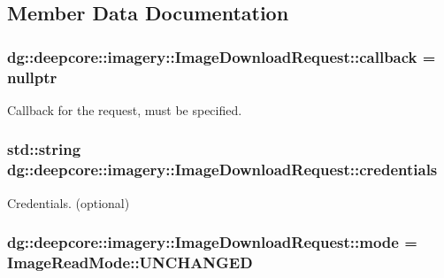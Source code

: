 \subsection{Member Data Documentation}
\subsubsection[{\texorpdfstring{callback}{callback}}]{ dg\+::deepcore\+::imagery\+::\+Image\+Download\+Request\+::callback = nullptr}\hypertarget{structdg_1_1deepcore_1_1imagery_1_1_image_download_request_a8a891c06a52754a53a40226667e04bc8}{}\label{structdg_1_1deepcore_1_1imagery_1_1_image_download_request_a8a891c06a52754a53a40226667e04bc8}


Callback for the request, must be specified. 

\subsubsection[{\texorpdfstring{credentials}{credentials}}]{\setlength{\rightskip}{0pt plus 5cm}std\+::string dg\+::deepcore\+::imagery\+::\+Image\+Download\+Request\+::credentials}\hypertarget{structdg_1_1deepcore_1_1imagery_1_1_image_download_request_a70f18d1687b3b2582f1dd2c7db9ed289}{}\label{structdg_1_1deepcore_1_1imagery_1_1_image_download_request_a70f18d1687b3b2582f1dd2c7db9ed289}


Credentials. (optional) 

\subsubsection[{\texorpdfstring{mode}{mode}}]{ dg\+::deepcore\+::imagery\+::\+Image\+Download\+Request\+::mode = {\bf Image\+Read\+Mode\+::\+U\+N\+C\+H\+A\+N\+G\+ED}}\hypertarget{structdg_1_1deepcore_1_1imagery_1_1_image_download_request_ada07837e04cd62ff704e540460173497}{}\label{structdg_1_1deepcore_1_1imagery_1_1_image_download_request_ada07837e04cd62ff704e540460173497}


